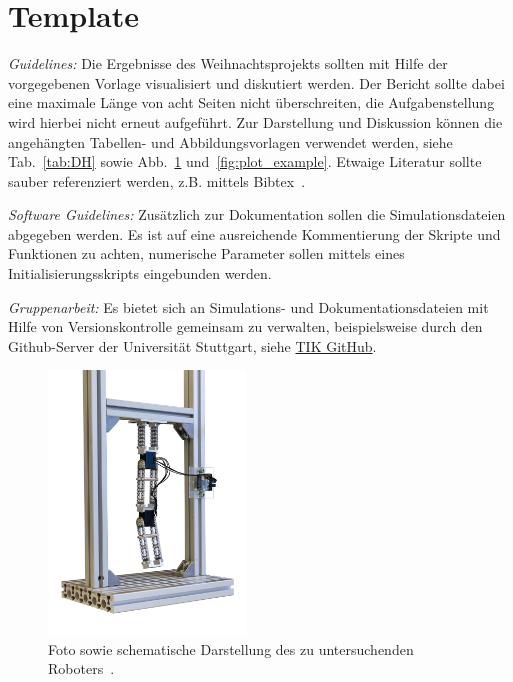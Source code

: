 \section*{Template}


\textit{Guidelines:} Die Ergebnisse des Weihnachtsprojekts sollten mit Hilfe der vorgegebenen Vorlage  visualisiert und diskutiert werden. 
Der Bericht sollte dabei eine maximale Länge von acht Seiten nicht überschreiten, die Aufgabenstellung wird hierbei nicht erneut aufgeführt. 
Zur Darstellung und Diskussion können die angehängten Tabellen- und Abbildungsvorlagen verwendet werden, siehe Tab.~\ref{tab:DH} sowie Abb.~\ref{fig:Roboter} und~\ref{fig:plot_example}. 
Etwaige Literatur sollte sauber referenziert werden, z.B. mittels Bibtex~\cite{FehrSchmidSchneiderEberhard20,Fuchs23, DenavitHartenberg55,Lipkin05}.

\textit{Software Guidelines:}
Zusätzlich zur Dokumentation sollen die Simulationsdateien abgegeben werden.
Es ist auf eine ausreichende Kommentierung der Skripte und Funktionen zu achten, numerische Parameter sollen mittels eines Initialisierungsskripts eingebunden werden.

\textit{Gruppenarbeit:}
Es bietet sich an Simulations- und Dokumentationsdateien mit Hilfe von Versionskontrolle gemeinsam zu verwalten, beispielsweise durch den Github-Server der Universität Stuttgart, siehe \href{https://www.tik.uni-stuttgart.de/dienste-a-z/Git-Hosting/}{TIK GitHub}.




\clearpage


\begin{figure}[t]
	\centering
	\includegraphics[height=7cm]{img/Versuchsaufbau.png}
	\hspace{1cm}
	\def\svgwidth{5.5cm}
	
	\caption{Foto sowie schematische Darstellung des zu untersuchenden Roboters~\cite{Fuchs23}.}
	\label{fig:Roboter}
\end{figure}

